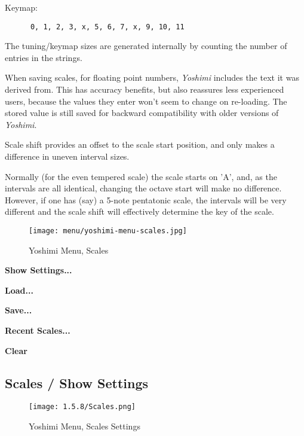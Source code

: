    Keymap:

   \begin{verbatim}
      0, 1, 2, 3, x, 5, 6, 7, x, 9, 10, 11
   \end{verbatim}

   The tuning/keymap sizes are generated internally by counting the number of
   entries in the strings.

   When saving scales, for floating point numbers, \textsl{Yoshimi} includes
   the text it was derived from. This has accuracy benefits,
   but also reassures less experienced users,
   because the values they enter won't seem to change on
   re-loading.  The stored value is still saved for backward compatibility with
   older versions of \textsl{Yoshimi}.

   Scale shift provides an offset to the scale start position, and only makes a
   difference in uneven interval sizes.

   Normally (for the even tempered scale) the scale starts on 'A', and, as the
   intervals are all identical, changing the octave start will make no
   difference. However, if one has (say) a 5-note pentatonic scale, the
   intervals will be very different and the scale shift will effectively
   determine the key of the scale.

\begin{figure}[H]
   \centering
   \texttt{[image: menu/yoshimi-menu-scales.jpg]}
   \caption{Yoshimi Menu, Scales}
   \label{fig:yoshimi_scales}
\end{figure}

   \begin{enumber}
      \item \textbf{Show Settings...}
      \item \textbf{Load...}
      \item \textbf{Save...}
      \item \textbf{Recent Scales...}
      \item \textbf{Clear}
   \end{enumber}

\subsection{Scales / Show Settings}
\label{subsec:scales_show}

\begin{figure}[H]
   \centering
   \texttt{[image: 1.5.8/Scales.png]}
   \caption{Yoshimi Menu, Scales Settings}
   \label{fig:yoshimi_scales_settings}
\end{figure}

